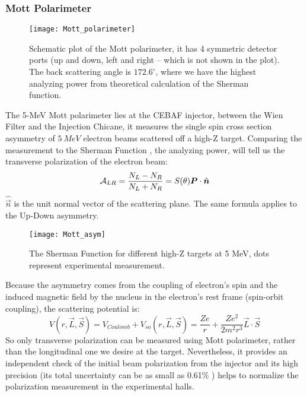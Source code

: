 \subsubsection{Mott Polarimeter}
\begin{figure}
    \centering
    \texttt{[image: Mott\_polarimeter]}
    \caption{Schematic plot of the Mott polarimeter, it has 4 symmetric detector
    ports (up and down, left and right -- which is not shown in the plot). 
    The back scattering angle is $172.6^\circ$, where we have the
    highest analyzing power from theoretical calculation of the Sherman function.
    \cite{PhysRevC.102.015501}}
\end{figure}
The 5-MeV Mott polarimeter lies at the CEBAF injector, between the Wien Filter
and the Injection Chicane, it measures the single spin cross section asymmetry
of $5\ MeV$ electron beams scattered off a high-Z target. Comparing the measurement
to the Sherman Function \cite{PhysRev.103.1601}, the analyzing power, will tell
us the transverse polarization of the electron beam:
\begin{equation}
    \mathcal{A}_{LR} = \frac{N_L - N_R}{N_L + N_R} = S(\theta)\boldsymbol{P}\cdot \hat{\boldsymbol{n}}
\end{equation}
$\hat{\vec{n}}$ is the unit normal vector of the scattering plane. The same formula
applies to the Up-Down asymmetry.
\begin{figure}
    \centering
    \texttt{[image: Mott\_asym]}
    \caption{The Sherman Function for different high-Z targets at 5 MeV, dots
    represent experimental measurement.}
\end{figure}
Because the asymmetry comes from the coupling of electron's spin and the induced
magnetic field by the nucleus in the electron's rest frame (spin-orbit coupling), 
the scattering potential is:
\begin{equation}
    V(r, \vec{L}, \vec{S}) = V_{Coulomb} + V_{so} (r, \vec{L}, \vec{S}) = \frac{Ze}{r} + \frac{Ze^2}{2m^2r^3}\vec{L}\cdot \vec{S}
\end{equation}
So only transverse polarization can be measured using Mott polarimeter, rather
than the longitudinal one we desire at the target. Nevertheless, it provides an
independent check of the initial beam polarization from the injector and its high
precision (its total uncertainty can be as small as 0.61\% \cite{PhysRevC.102.015501}) 
helps to normalize the polarization measurement in the experimental halls.

